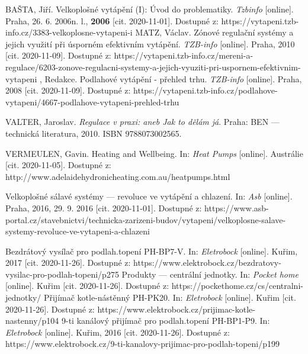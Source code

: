 \begin{thebibliography}{3}
BAŠTA, Jiří. Velkoplošné vytápění (I): Úvod do problematiky. \textit{Tzbinfo} [online]. Praha, 26. 6. 2006n. l., \textbf{2006} [cit. 2020-11-01]. Dostupné z: https://vytapeni.tzb-info.cz/3383-velkoplosne-vytapeni-i
MATZ, Václav. Zónové regulační systémy a jejich využití při úsporném efektivním vytápění. \textit{TZB-info} [online]. Praha, 2010 [cit. 2020-11-09]. Dostupné z: https://vytapeni.tzb-info.cz/mereni-a-regulace/6203-zonove-regulacni-systemy-a-jejich-vyuziti-pri-uspornem-efektivnim-vytapeni
, Redakce. Podlahové vytápění - přehled trhu. \textit{TZB-info} [online]. Praha, 2008 [cit. 2020-11-09]. Dostupné z: https://vytapeni.tzb-info.cz/podlahove-vytapeni/4667-podlahove-vytapeni-prehled-trhu

VALTER, Jaroslav. \textit{Regulace v praxi: aneb Jak to dělám já}. Praha: BEN --- technická literatura, 2010. ISBN 9788073002565.

VERMEULEN, Gavin. Heating and Wellbeing. In: \textit{Heat Pumps} [online]. Austrálie [cit. 2020-11-05]. Dostupné z: http://www.adelaidehydronicheating.com.au/heatpumps.html

Velkoplošné sálavé systémy --- revoluce ve vytápění a chlazení. In: \textit{Asb} [online]. Praha, 2016, 29. 9. 2016 [cit. 2020-11-01]. Dostupné z: https://www.asb-portal.cz/stavebnictvi/technicka-zarizeni-budov/vytapeni/velkoplosne-salave-systemy-revoluce-ve-vytapeni-a-chlazeni

Bezdrátový vysílač pro podlah.topení PH-BP7-V. In: \textit{Eletrobock} [online]. Kuřim, 2017 [cit. 2020-11-26]. Dostupné z: https://www.elektrobock.cz/bezdratovy-vysilac-pro-podlah-topeni/p275
Produkty --- centrální jednotky. In: \textit{Pocket home} [online]. Kuřim [cit. 2020-11-26]. Dostupné z: https://pockethome.cz/cs/centralni-jednotky/
Přijímač kotle-nástěnný PH-PK20. In: \textit{Eletrobock} [online]. Kuřim [cit. 2020-11-26]. Dostupné z: https://www.elektrobock.cz/prijimac-kotle-nastenny/p104
9-ti kanálový přijímač pro podlah.topení PH-BP1-P9. In: \textit{Eletrobock} [online]. Kuřim, 2016 [cit. 2020-11-26]. Dostupné z: https://www.elektrobock.cz/9-ti-kanalovy-prijimac-pro-podlah-topeni/p199


\end{thebibliography}
